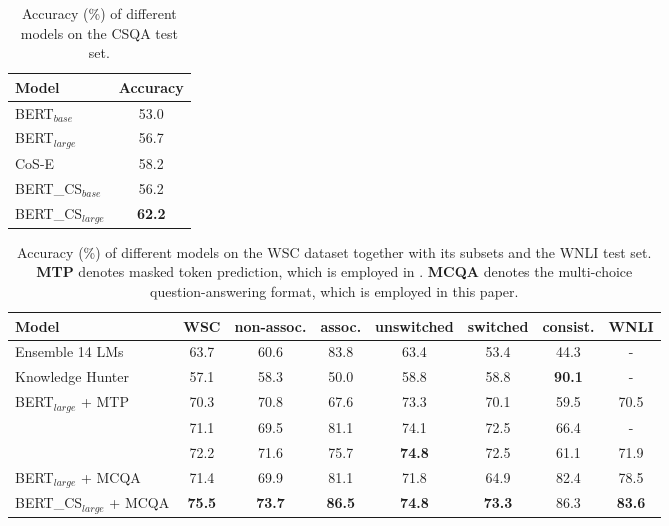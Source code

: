 \documentclass[11pt,a4paper]{article}
\begin{document}
\begin{table}[t!]
	\begin{center}
		\small
		\begin{tabular}{p{3.8cm}|c}
			\toprule
			\textbf{Model}             & \textbf{Accuracy}  \\
			\midrule
			BERT$_{base}$     & 53.0     \\
			\midrule
			BERT$_{large}$ & 56.7 \\
			\midrule
			CoS-E \citep{rajani2019explain} & 58.2 \\
			\bottomrule
			\toprule
			BERT\_CS$_{base}$  & 56.2   \\
			\midrule
			BERT\_CS$_{large}$   & \textbf{62.2}   \\
			\bottomrule
		\end{tabular}
	\end{center}
	\caption{Accuracy (\%) of different models on the CSQA test set.}
	\label{tab:CSQA_results}
\end{table}


\begin{table*}[t!]
	\begin{center}
		\small
		\begin{tabular}{p{3.4cm}|c|c|c|c|c|c|c}
			\toprule
            \textbf{Model}                        & \textbf{WSC}   & \textbf{non-assoc.} & \textbf{assoc.}        & \textbf{unswitched} & \textbf{switched} & \textbf{consist.} & \textbf{WNLI} \\
            \midrule
            Ensemble 14 LMs                  & 63.7 & 60.6      & 83.8& 63.4 & 53.4     & 44.3     & -    \\
            \midrule
            Knowledge Hunter             & 57.1 & 58.3      & 50.0           & 58.8       &58.8     & \textbf{90.1}     & -    \\
            \midrule
            BERT$_{large}$ + MTP         & 70.3 & 70.8      & 67.6         & 73.3       &70.1     & 59.5& 70.5 \\
            \midrule
            \citet{ruan2019exploring}     & 71.1 & 69.5 & 81.1& 74.1 & 72.5 & 66.4 & - \\
            \midrule
            \citet{kocijan2019surprisingly} & 72.2 & 71.6 & 75.7 & \textbf{74.8} & 72.5 & 61.1 & 71.9 \\
            \bottomrule
            \toprule
            BERT$_{large}$ + MCQA       & 71.4 & 69.9 & 81.1 & 71.8 & 64.9 & 82.4& 78.5 \\
            \midrule
            BERT\_CS$_{large}$ + MCQA   & \textbf{75.5} & \textbf{73.7} & \textbf{86.5}&\textbf{74.8} & \textbf{73.3} & 86.3 & \textbf{83.6} \\
			\bottomrule
		\end{tabular}
	\end{center}
	\caption{Accuracy (\%) of different models on the WSC dataset together with its subsets and the WNLI test set. 
	\textbf{MTP} denotes masked token prediction, which is employed in \citet{kocijan2019surprisingly}.
	\textbf{MCQA} denotes the multi-choice question-answering format, which is employed in this paper.}
	\label{tab:WSC_results}
\end{table*}
\end{document}
